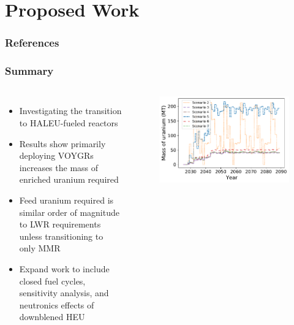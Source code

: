\documentclass[9pt,xcolor={table}]{beamer}
\begin{document}
\section{Proposed Work}

%



\begin{frame}[allowframebreaks]
    \frametitle{References}
    
    {\footnotesize  }
  
  \end{frame}
\begin{frame}
    \frametitle{Summary}
    \begin{columns}
      \column[t]{5cm}
      \begin{itemize}
        \item Investigating the transition to \gls{HALEU}-fueled reactors
        \item Results show primarily deploying VOYGRs increases the mass 
              of enriched uranium required
        \item Feed uranium required is similar order of magnitude to \gls{LWR}
              requirements unless transitioning to only \gls{MMR}
        \item Expand work to include closed fuel cycles, sensitivity 
              analysis, and neutronics effects of downblened \gls{HEU}
      \end{itemize}

      \column[t]{5cm}
        \begin{figure}[t]
          \includegraphics[scale=0.35]{nogrowth_AR_uranium.pdf}
        \end{figure}
        
    \end{columns}
    
\end{frame}



\end{document}
